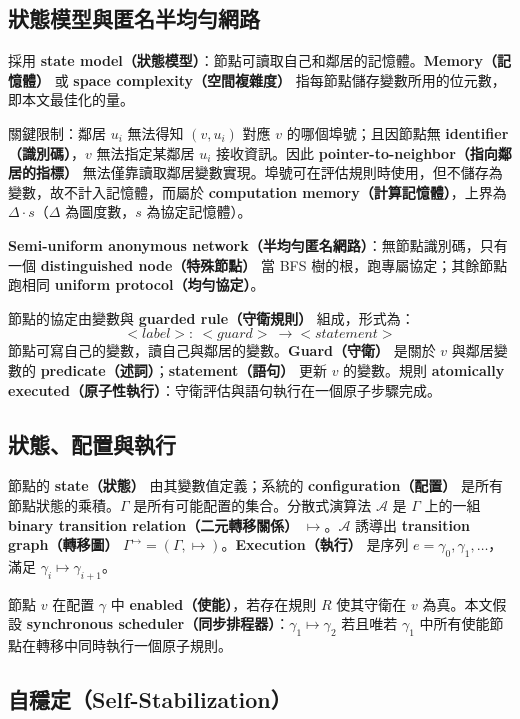 \documentclass[a4paper, 12pt]{article}
\begin{document}
\subsection{狀態模型與匿名半均勻網路}
\label{subsec:prelim-model}

採用 \textbf{state model（狀態模型）}：節點可讀取自己和鄰居的記憶體。\textbf{Memory（記憶體）} 或 \textbf{space complexity（空間複雜度）} 指每節點儲存變數所用的位元數，即本文最佳化的量。

關鍵限制：鄰居 $u_i$ 無法得知 $(v,u_i)$ 對應 $v$ 的哪個埠號；且因節點無 \textbf{identifier（識別碼）}，$v$ 無法指定某鄰居 $u_i$ 接收資訊。因此 \textbf{pointer-to-neighbor（指向鄰居的指標）} 無法僅靠讀取鄰居變數實現。埠號可在評估規則時使用，但不儲存為變數，故不計入記憶體，而屬於 \textbf{computation memory（計算記憶體）}，上界為 $\Delta\cdot s$（$\Delta$ 為圖度數，$s$ 為協定記憶體）。

\textbf{Semi-uniform anonymous network（半均勻匿名網路）}：無節點識別碼，只有一個 \textbf{distinguished node（特殊節點）} 當 BFS 樹的根，跑專屬協定；其餘節點跑相同 \textbf{uniform protocol（均勻協定）}。

節點的協定由變數與 \textbf{guarded rule（守衛規則）} 組成，形式為：
\[
<label>:\ <guard>\ \longrightarrow <statement>
\]
節點可寫自己的變數，讀自己與鄰居的變數。\textbf{Guard（守衛）} 是關於 $v$ 與鄰居變數的 \textbf{predicate（述詞）}；\textbf{statement（語句）} 更新 $v$ 的變數。規則 \textbf{atomically executed（原子性執行）}：守衛評估與語句執行在一個原子步驟完成。

\subsection{狀態、配置與執行}
\label{subsec:prelim-config}

節點的 \textbf{state（狀態）} 由其變數值定義；系統的 \textbf{configuration（配置）} 是所有節點狀態的乘積。$\Gamma$ 是所有可能配置的集合。分散式演算法 $\mathcal{A}$ 是 $\Gamma$ 上的一組 \textbf{binary transition relation（二元轉移關係）} $\mapsto$。$\mathcal{A}$ 誘導出 \textbf{transition graph（轉移圖）} $\Gamma^{\mapsto}=(\Gamma,\mapsto)$。\textbf{Execution（執行）} 是序列 $e=\gamma_0,\gamma_1,\dots$，滿足 $\gamma_i\mapsto\gamma_{i+1}$。

節點 $v$ 在配置 $\gamma$ 中 \textbf{enabled（使能）}，若存在規則 $R$ 使其守衛在 $v$ 為真。本文假設 \textbf{synchronous scheduler（同步排程器）}：$\gamma_1\mapsto\gamma_2$ 若且唯若 $\gamma_1$ 中所有使能節點在轉移中同時執行一個原子規則。

\subsection{自穩定（Self-Stabilization）}
\label{subsec:prelim-selfstab}
\end{document}
